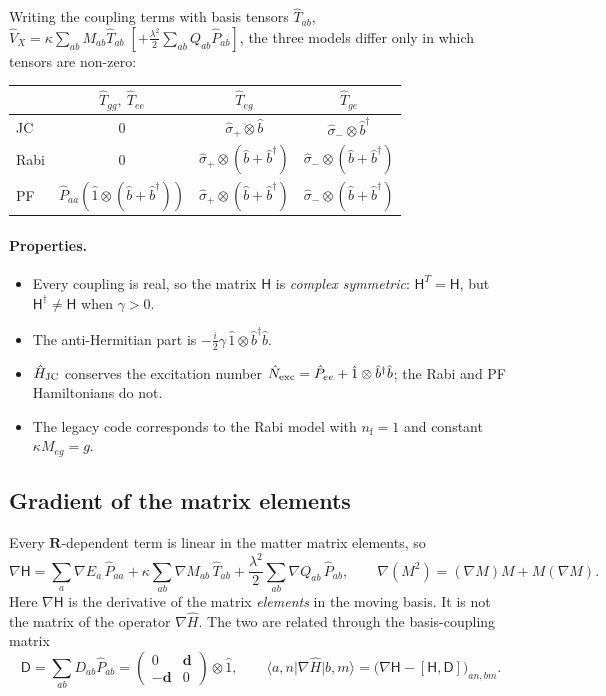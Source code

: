 \documentclass[11pt]{article}
\newcommand{\ket}[1]{\lvert #1 \rangle}
\newcommand{\bra}[1]{\langle #1 \rvert}
\newcommand{\R}{\mathbf{R}}
\newcommand{\grad}{\nabla}
\newcommand{\dd}{\mathbf{d}}
\newcommand{\bdag}{\hat b^{\dagger}}
\newcommand{\bop}{\hat b}
\newcommand{\Hm}{\mathsf{H}}
\newcommand{\Dm}{\mathsf{D}}
\newcommand{\nf}{n_{\mathrm f}}
\begin{document}
Writing the coupling terms with basis tensors $\hat T_{ab}$, $\hat V_X=\kappa\sum_{ab}M_{ab}\hat T_{ab}\;[+\tfrac{\lambda^2}{2}\sum_{ab}Q_{ab}\hat P_{ab}]$, the three models differ only in which tensors are non-zero:

\begin{center}
\begin{tabular}{lccc}
\toprule
 & $\hat T_{gg},\ \hat T_{ee}$ & $\hat T_{eg}$ & $\hat T_{ge}$\\
\midrule
JC & 0 & $\hat\sigma_+\otimes\bop$ & $\hat\sigma_-\otimes\bdag$\\
Rabi & 0 & $\hat\sigma_+\otimes(\bop+\bdag)$ & $\hat\sigma_-\otimes(\bop+\bdag)$\\
PF & $\hat P_{aa}(\hat 1\otimes(\bop+\bdag))$ & $\hat\sigma_+\otimes(\bop+\bdag)$ & $\hat\sigma_-\otimes(\bop+\bdag)$\\
\bottomrule
\end{tabular}
\end{center}

\paragraph{Properties.}
\begin{itemize}
\item Every coupling is real, so the matrix $\Hm$ is \emph{complex symmetric}: $\Hm^T=\Hm$, but $\Hm^\dagger\neq\Hm$ when $\gamma>0$.
\item The anti-Hermitian part is $-\tfrac{i}{2}\gamma\,\hat 1\otimes\bdag\bop$.
\item $\hat H_{\rm JC}$ conserves the excitation number $\hat N_{\rm exc}=\hat P_{ee}+\hat 1\otimes\bdag\bop$; the Rabi and PF Hamiltonians do not.
\item The legacy code corresponds to the Rabi model with $\nf=1$ and constant $\kappa M_{eg}=g$.
\end{itemize}

\subsection{Gradient of the matrix elements}
Every $\R$-dependent term is linear in the matter matrix elements, so
\begin{equation}
\grad\Hm=\sum_a\grad E_a\,\hat P_{aa}+\kappa\sum_{ab}\grad M_{ab}\,\hat T_{ab}+\frac{\lambda^2}{2}\sum_{ab}\grad Q_{ab}\,\hat P_{ab},
\qquad \grad(M^2)=(\grad M)M+M(\grad M).
\label{eq:gradH}
\end{equation}
Here $\grad\Hm$ is the derivative of the matrix \emph{elements} in the moving basis. It is not the matrix of the operator $\grad\hat H$. The two are related through the basis-coupling matrix
\begin{equation}
\Dm=\sum_{ab}D_{ab}\hat P_{ab}=\begin{pmatrix}0&\dd\\-\dd&0\end{pmatrix}\otimes\hat 1,
\qquad
\bra{a,n}\grad\hat H\ket{b,m}=\big(\grad\Hm-[\Hm,\Dm]\big)_{an,bm}.
\label{eq:Dfull}
\end{equation}
\end{document}
